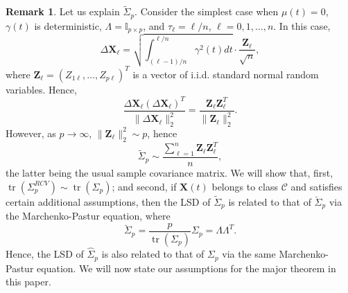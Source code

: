 \documentclass[a4paper,11pt]{book}
\theoremstyle{plain}
\theoremstyle{definition}
\newtheorem{rmrk}[thm]{Remark}
\newcommand{\tr}{\operatorname{tr}}
\begin{document}
    \begin{rmrk}
    	Let us explain $\widetilde{\Sigma}_p$. Consider the simplest case when $\mu(t) = 0$, $\gamma(t)$ is deterministic, $\Lambda = \mathbb{I}_{p \times p}$, and $\tau_{\ell} = \ell / n$, $\ell = 0, 1, \dots, n$. In this case,
    	\[ \Delta \mathbf{X}_\ell = \sqrt{\int_{(\ell - 1)/n}^{\ell / n} \gamma^2(t) dt }\cdot \frac{\mathbf{Z}_\ell}{\sqrt{n}}, \]
    	where $\mathbf{Z}_\ell = (Z_{1\ell}, \dots, Z_{p\ell})^T$ is a vector of i.i.d. standard normal random variables. Hence,
    	\[ \frac{\Delta \mathbf{X}_\ell (\Delta \mathbf{X}_\ell)^T}{\| \Delta \mathbf{X}_\ell \|_2^2} = \frac{\mathbf{Z}_\ell \mathbf{Z}_\ell^T}{\|  \mathbf{Z}_\ell \|_2^2}. \]
    	However, as $p \rightarrow \infty$, $\| \mathbf{Z}_\ell \|_2^2 \sim p$, hence
    	\[ \widetilde{\Sigma}_p \sim \frac{\sum_{\ell = 1}^{n}\mathbf{Z}_\ell \mathbf{Z}_\ell^T}{n}, \]
    	the latter being the usual sample covariance matrix.
    	We will show that, first, $\tr(\Sigma_p^{RCV}) \sim \tr(\Sigma_p)$; and second, if $\mathbf{X}(t)$ belongs to class $\mathcal{C}$ and satisfies certain additional assumptions, then the LSD of $\widetilde{\Sigma}_p$ is related to that of $\breve{\Sigma}_p$ via the Marchenko-Pastur equation, where
    	\[ \breve{\Sigma}_p = \frac{p}{\tr(\Sigma_p)}\Sigma_p = \Lambda \Lambda^T. \]
    	Hence, the LSD of $\widehat{\Sigma}_p$ is also related to that of $\Sigma_p$ via the same Marchenko-Pastur equation.
    	We will now state our assumptions for the major theorem in this paper.
    \end{rmrk}
    
\end{document}
